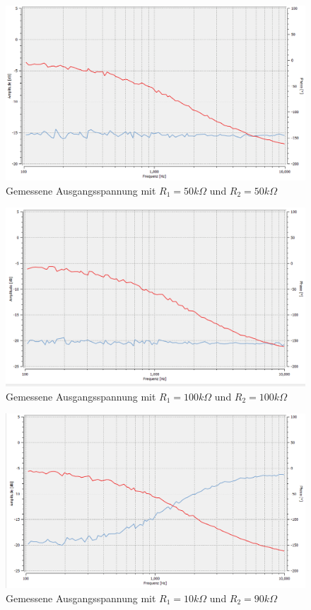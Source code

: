 \begin{figure}[htb]
    \includegraphics[width=16cm]{./pictures/Messungen/Gesamtschaltung_Test_50_50}
    \caption{Gemessene Ausgangsspannung mit $R_1 = 50k\Omega$ und $R_2 = 50k\Omega$}
    \label{fig:Gesamtschaltung_Test_50_50}
\end{figure}

\begin{figure}[htb]
    \includegraphics[width=16cm]{./pictures/Messungen/Gesamtschaltung_Test_100_100}
    \caption{Gemessene Ausgangsspannung mit $R_1 = 100k\Omega$ und $R_2 = 100k\Omega$}
    \label{fig:Gesamtschaltung_Test_100_100}
\end{figure}

\newpage

\begin{figure}[htb]
    \includegraphics[width=16cm]{./pictures/Messungen/Gesamtschaltung_Test_10_90}
    \caption{Gemessene Ausgangsspannung mit $R_1 = 10k\Omega$ und $R_2 = 90k\Omega$}
    \label{fig:Gesamtschaltung_Test_10_90}
\end{figure}

